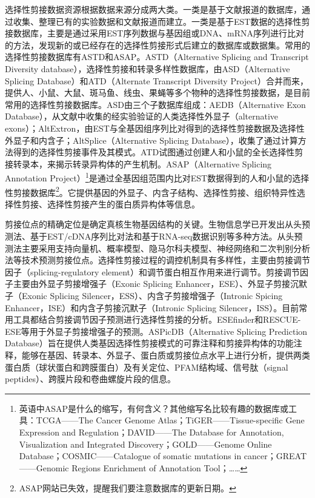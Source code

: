 \documentclass[11pt,a4paper,twoside]{book}
\begin{document}
选择性剪接数据资源根据数据来源分成两大类。一类是基于文献报道的数据库，通过收集、整理已有的实验数据和文献报道而建立。一类是基于EST数据的选择性剪接数据库，主要是通过采用EST序列数据与基因组或DNA、mRNA序列进行比对的方法，发现新的或已经存在的选择性剪接形式后建立的数据库或数据集。常用的选择性剪接数据库有ASTD和ASAP。ASTD（Alternative Splicing and Transcript Diversity database），选择性剪接和转录多样性数据库，由ASD（Alternative Splicing Database）和ATD（Alternate Transcript Diversity Project）合并而来，提供人、小鼠、大鼠、斑马鱼、线虫、果蝇等多个物种的选择性剪接数据，是目前常用的选择性剪接数据库。ASD由三个子数据库组成：AEDB（Alternative Exon Database），从文献中收集的经实验验证的人类选择性外显子（alternative exons）；AltExtron，由EST与全基因组序列比对得到的选择性剪接数据及选择性外显子和内含子；AltSplice（Alternative Splicing Database），收集了通过计算方法得到的选择性剪接事件及其模式。ATD试图通过创建人和小鼠的全长选择性剪接转录本，来揭示转录异构体的产生机制。ASAP（Alternative Splicing Annotation Project）\footnote{英语中ASAP是什么的缩写，有何含义？其他缩写名比较有趣的数据库或工具：TCGA——The Cancer Genome Atlas；TiGER——Tissue-specific Gene Expression and Regulation；DAVID——The Database for Annotation, Visualization and Integrated Discovery；GOLD——Genome Online Database；COSMIC——Catalogue of somatic mutations in cancer；GREAT——Genomic Regions Enrichment of Annotation Tool；……}是通过全基因组范围内比对EST数据得到的人和小鼠的选择性剪接数据库\footnote{ASAP网站已失效，提醒我们要注意数据库的更新日期。}。它提供基因的外显子、内含子结构、选择性剪接、组织特异性选择性剪接、选择性剪接产生的蛋白质异构体等信息。

剪接位点的精确定位是确定真核生物基因结构的关键。生物信息学已开发出从头预测法、基于EST/cDNA序列比对法和基于RNA-seq数据识别等多种方法。从头预测法主要采用支持向量机、概率模型、隐马尔科夫模型、神经网络和二次判别分析法等技术预测剪接位点。选择性剪接过程的调控机制具有多样性，主要由剪接调节因子（splicing-regulatory element）和调节蛋白相互作用来进行调节。剪接调节因子主要由外显子剪接增强子（Exonic Splicing Enhancer，ESE）、外显子剪接沉默子（Exonic Splicing Silencer，ESS）、内含子剪接增强子（Intronic Spicing Enhancer，ISE）和内含子剪接沉默子（Intronic Splicing Silencer，ISS）。目前常用工具都结合剪接调节因子预测进行选择性剪接的分析。ESEfinder和RESCUE-ESE等用于外显子剪接增强子的预测。ASPicDB（Alternative Splicing Prediction Database）旨在提供人类基因选择性剪接模式的可靠注释和剪接异构体的功能注释，能够在基因、转录本、外显子、蛋白质或剪接位点水平上进行分析，提供两类蛋白质（球状蛋白和跨膜蛋白）及有关定位、PFAM结构域、信号肽（signal peptides）、跨膜片段和卷曲螺旋片段的信息。
\end{document}
